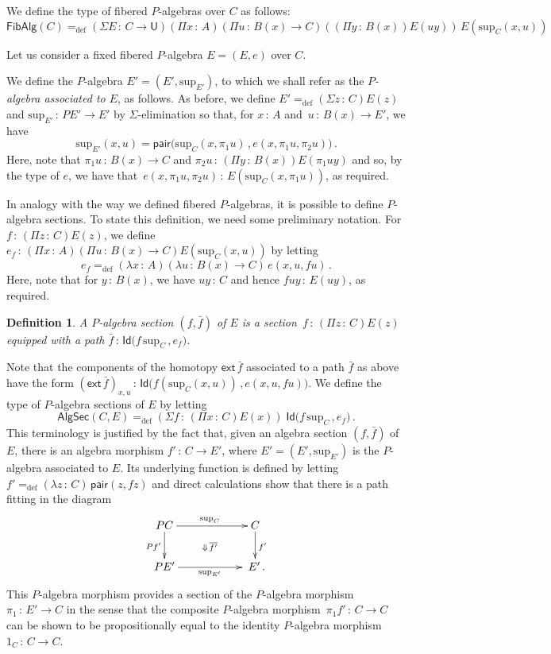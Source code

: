 \documentclass[10pt,a4paper,oneside,reqno]{amsart}
\numberwithin{equation}{section}
\theoremstyle{mythm}
\theoremstyle{mydef}
\newtheorem{definition}[theorem]{Definition}
\theoremstyle{myrmk}
\newcommand{\defeq}{=_{\mathrm{def}}}
\newcommand{\co}{\,{:}\,}
\newcommand{\ext}{\mathsf{ext}}
\newcommand{\Id}{\mathsf{Id}}
\newcommand{\pair}{\mathsf{pair}}
\newcommand{\U}{\mathsf{U}}
\renewcommand{\sup}{\mathrm{sup}}
\newcommand{\FibPalg}{\mathsf{FibAlg}}
\newcommand{\PalgSec}{\mathsf{AlgSec}}
\begin{document}
We define the type of fibered $P$-algebras 
over $C$ as follows:
\[
\FibPalg(C) \defeq (\Sigma E \co C \to \U) (\Pi x \co A) (\Pi u \co B(x) \to C) 
 ((\Pi y \co B(x)) E(u y))\,  E(\sup_C(x,u))
 \]
  
 Let us consider a fixed fibered $P$-algebra $E = (E, e)$ over $C$. 
 
 \medskip
 
We define the $P$-algebra $E' = (E', \sup_{E'})$, to which we shall refer as the \emph{$P$-algebra associated to $E$}, 
as follows. As before,
we define $E' \defeq (\Sigma z \co C) E(z)$ and  $\sup_{E'} \co PE' \to E'$  by $\Sigma$-elimination 
so that, for $x \co A$ and~$u \co B(x) \to E'$, we have
\[
\sup_{E'}(x,u) = 
\pair \big( 
\sup_C(x, \pi_1 u ) \, , 
e( x, \pi_1 u, \pi_2 u) \big)  \, .
\]
Here, note that $\pi_1 u \co B(x) \to C$ and $\pi_2 u \co (\Pi y \co B(x)) E(\pi_1 u y)$ and so,
by the type of $e$, we have that~$e(x, \pi_1 u, \pi_2 u) \co E( \sup_C(x, \pi_1 u))$, as required.

In analogy with the way we defined fibered $P$-algebras, it is possible to define 
$P$-algebra sections. To state this definition, we need some preliminary notation.
For  $f \co (\Pi z \co C) E(z)$,
we define $e_f \co (\Pi x \co A)(\Pi u \co B(x) \to C) E(\sup_C(x,u))$ by letting
\begin{equation}
\label{equ:ef}
 e_f \defeq (\lambda x \co A)(\lambda u \co B(x) \to C) \, e(x, u, f u) \, .
\end{equation}
Here, note that for $y \co B(x)$, we have $u y \co C$ and hence $f u y \co E(uy)$,
as required.


\begin{definition} \label{def:fibalgsection} 
A \emph{$P$-algebra section} $(f, \bar{f})$ of $E$ is a section~$f \co (\Pi z \co C) E(z)$ equipped
with a path 
$\bar{f} \co  \Id \big( f \,  \sup_C \, , e_f \big)$.
\end{definition} 

Note that the components of the homotopy $\ext \, \bar{f}$ associated to a path $\bar{f}$ as above have the 
form $(\ext \, \bar{f})_{x,u} \co \Id \big( f(\sup_C(x,u)) \, , e(x, u, fu) \big)$.   We define the type of $P$-algebra sections of $E$ by letting
\[ 
\PalgSec(C,E)  \defeq (\Sigma f  \co (\Pi x \co C) E(x)) \; \Id \big( f \, \sup_C \, , e_f  \big) \, .
\]
This terminology is justified by the fact that, given an algebra section $(f, \bar{f})$ of $E$, there is an algebra 
morphism $f' \co C \to E'$, where  $E' = (E', \sup_{E'})$ is  the $P$-algebra associated to $E$. 
Its underlying function is defined by letting $f' \defeq (\lambda z \co C) \, \pair(z, fz)$
and direct calculations show that there is a path fitting in the diagram
\[
\xymatrix@C=2cm{
PC \ar[d]_{Pf'} \ar[r]^{\sup_C} \ar@{}[dr]|{\Downarrow \, \overline{f'}} & C \ar[d]^{f'} \\
PE' \ar[r]_{\sup_{E'} } & \; E' \, .}
\]
This $P$-algebra morphism provides
a section of the $P$-algebra morphism~$\pi_1 \co E' \to C$ in the sense that the composite $P$-algebra
morphism~$\pi_1  f' \co C \to C$ can be shown to be propositionally equal to the identity $P$-algebra
morphism~$1_C \co C \to C$. 
\end{document}
